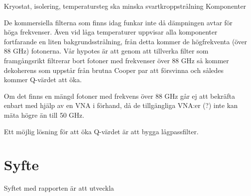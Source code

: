 \documentclass[main.tex]{subfiles}
\begin{document}
Kryostat, isolering, temperatursteg ska minska svartkroppstrålning Komponenter

De kommersiella filterna som finns idag funkar inte då dämpningen avtar för höga frekvenser. Även vid låga temperaturer uppvisar alla komponenter fortfarande en liten bakgrundsstrålning, från detta kommer de högfrekventa (över 88 GHz) fotonerna. Vår hypotes är att genom att tillverka filter som framgångsrikt filtrerar bort fotoner med frekvenser över 88 GHz så kommer dekoherens som uppstår från brutna Cooper par att försvinna och således kommer Q-värdet att öka.


Om det finns en mängd fotoner med frekvens över 88 GHz går ej att bekräfta enbart med hjälp av en VNA i förhand, då de tillgängliga VNA:er (?) inte kan mäta högre än till 50 GHz.



Ett möjlig lösning för att öka Q-värdet är att bygga lågpassfilter. 

\section{Syfte}
Syftet med rapporten är att utveckla 

\end{document}
